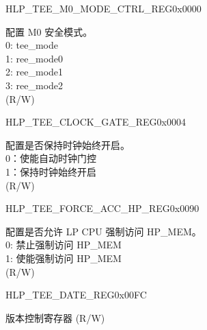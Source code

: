 \begin{register}{H}{LP\_TEE\_M0\_MODE\_CTRL\_REG}{0x0000}\label{regdesc:LPTEEM0MODECTRLREG}
%
%
\regnewline%
\begin{regdesc}\begin{reglist}
\label{fielddesc:LPTEEM0MODE}\item [LP\_TEE\_M0\_MODE] 配置 M0 安全模式。\\
0: tee\_mode \\
1: ree\_mode0 \\
2: ree\_mode1 \\
3: ree\_mode2  \\ (R/W)
\end{reglist}\end{regdesc}
\end{register}


\begin{register}{H}{LP\_TEE\_CLOCK\_GATE\_REG}{0x0004}\label{regdesc:LPTEECLOCKGATEREG}
%
%
\regnewline%
\begin{regdesc}\begin{reglist}
\label{fielddesc:LPTEECLKEN}\item [LP\_TEE\_CLK\_EN] 配置是否保持时钟始终开启。\\
0：使能自动时钟门控 \\
1：保持时钟始终开启 \\ (R/W)
\end{reglist}\end{regdesc}
\end{register}


\begin{register}{H}{LP\_TEE\_FORCE\_ACC\_HP\_REG}{0x0090}\label{regdesc:LPTEEFORCEACCHPREG}
%
%
\regnewline%
\begin{regdesc}\begin{reglist}
\label{fielddesc:LPTEEFORCEACCHPMEMEN}\item [LP\_TEE\_FORCE\_ACC\_HPMEM\_EN] 配置是否允许 LP CPU 强制访问 HP\_MEM。\\
0: 禁止强制访问 HP\_MEM \\
1: 使能强制访问 HP\_MEM  \\ (R/W)
\end{reglist}\end{regdesc}
\end{register}


\begin{register}{H}{LP\_TEE\_DATE\_REG}{0x00FC}\label{regdesc:LPTEEDATEREG}
%
%
\regnewline%
\begin{regdesc}\begin{reglist}
\label{fielddesc:LPTEEDATEREG}\item [LP\_TEE\_DATE] 版本控制寄存器 (R/W)
\end{reglist}\end{regdesc}
\end{register}
